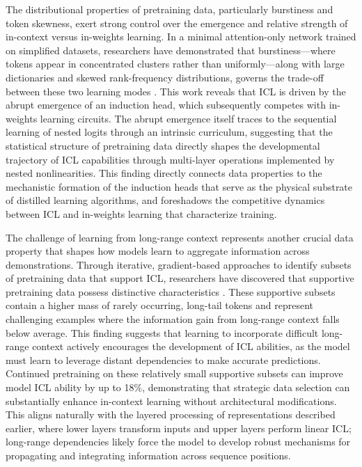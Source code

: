 \documentclass[11pt]{article}
\begin{document}
The distributional properties of pretraining data, particularly burstiness and token skewness, exert strong control over the emergence and relative strength of in-context versus in-weights learning. In a minimal attention-only network trained on simplified datasets, researchers have demonstrated that burstiness---where tokens appear in concentrated clusters rather than uniformly---along with large dictionaries and skewed rank-frequency distributions, governs the trade-off between these two learning modes \cite{ref55}. This work reveals that ICL is driven by the abrupt emergence of an induction head, which subsequently competes with in-weights learning circuits. The abrupt emergence itself traces to the sequential learning of nested logits through an intrinsic curriculum, suggesting that the statistical structure of pretraining data directly shapes the developmental trajectory of ICL capabilities through multi-layer operations implemented by nested nonlinearities. This finding directly connects data properties to the mechanistic formation of the induction heads that serve as the physical substrate of distilled learning algorithms, and foreshadows the competitive dynamics between ICL and in-weights learning that characterize training.

The challenge of learning from long-range context represents another crucial data property that shapes how models learn to aggregate information across demonstrations. Through iterative, gradient-based approaches to identify subsets of pretraining data that support ICL, researchers have discovered that supportive pretraining data possess distinctive characteristics \cite{ref41}. These supportive subsets contain a higher mass of rarely occurring, long-tail tokens and represent challenging examples where the information gain from long-range context falls below average. This finding suggests that learning to incorporate difficult long-range context actively encourages the development of ICL abilities, as the model must learn to leverage distant dependencies to make accurate predictions. Continued pretraining on these relatively small supportive subsets can improve model ICL ability by up to 18\%, demonstrating that strategic data selection can substantially enhance in-context learning without architectural modifications. This aligns naturally with the layered processing of representations described earlier, where lower layers transform inputs and upper layers perform linear ICL; long-range dependencies likely force the model to develop robust mechanisms for propagating and integrating information across sequence positions.
\end{document}
